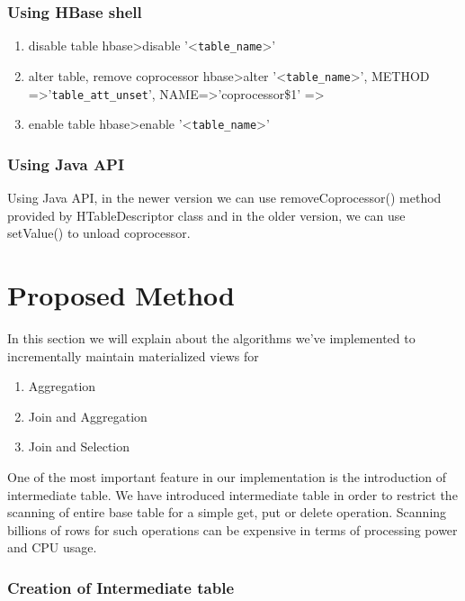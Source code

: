 \documentclass[11pt,a4paper,bibtotoc,idxtotoc,headsepline,footsepline,footexclude,BCOR12mm,DIV13]{scrbook}
\begin{document}
\subsubsection{Using HBase shell}
\begin{enumerate}
	\item disable table
	hbase\textgreater disable '\textless \texttt{table\_name}\textgreater'
	\item alter table, remove coprocessor
	hbase\textgreater alter '\textless \texttt{table\_name}\textgreater', \newline
	METHOD =\textgreater '\texttt{table\_att\_unset}', NAME=\textgreater 'coprocessor\$1' =\textgreater
	\item enable table
	hbase\textgreater enable '\textless \texttt{table\_name}\textgreater'
	 
\end{enumerate}

\subsubsection{Using Java API}
Using Java API, in the newer version we can use removeCoprocessor() method provided by HTableDescriptor class and in the older version, we can use setValue() to unload coprocessor.

\section{Proposed Method}
In this section we will explain about the algorithms we've implemented to incrementally maintain materialized views for 
\begin{enumerate}
	\item Aggregation
	\item Join and Aggregation
	\item Join and Selection
\end{enumerate}

One of the most important feature in our implementation is the introduction of intermediate table. We have introduced intermediate table in order to restrict the scanning of entire base table for a simple get, put or delete operation. Scanning billions of rows for such operations can be expensive in terms of processing power and CPU usage. 

\subsubsection{Creation of Intermediate table}
\label{subsec:intermediatetable}
\end{document}
